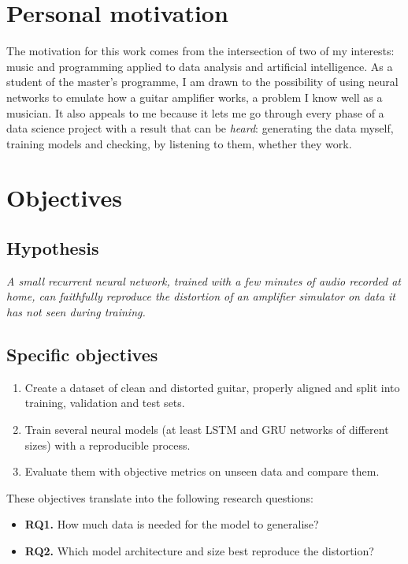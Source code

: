 \documentclass[ENG]{TFUOC}%
\begin{document}
\section{Personal motivation}

The motivation for this work comes from the intersection of two of my interests: music and programming applied to data analysis and artificial intelligence. As a student of the master's programme, I am drawn to the possibility of using neural networks to emulate how a guitar amplifier works, a problem I know well as a musician. It also appeals to me because it lets me go through every phase of a data science project with a result that can be \emph{heard}: generating the data myself, training models and checking, by listening to them, whether they work.

\section{Objectives}

\subsection{Hypothesis}

\textit{A small recurrent neural network, trained with a few minutes of audio recorded at home, can faithfully reproduce the distortion of an amplifier simulator on data it has not seen during training.}

\subsection{Specific objectives}

\begin{enumerate}[nosep,label=\textbf{O\arabic*.}]
    \item Create a dataset of clean and distorted guitar, properly aligned and split into training, validation and test sets.
    \item Train several neural models (at least LSTM and GRU networks of different sizes) with a reproducible process.
    \item Evaluate them with objective metrics on unseen data and compare them.
\end{enumerate}

These objectives translate into the following research questions:
\begin{itemize}[nosep]
    \item \textbf{RQ1.} How much data is needed for the model to generalise?
    \item \textbf{RQ2.} Which model architecture and size best reproduce the distortion?
\end{itemize}
\end{document}
